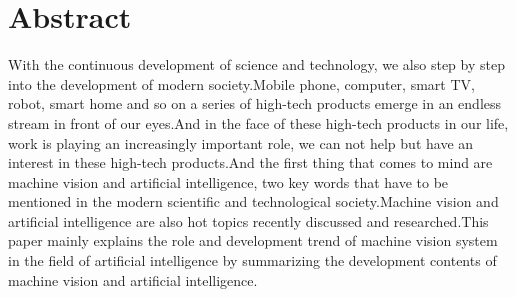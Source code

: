 \chapter*{Abstract}%

With the continuous development of science and technology, we also step by step into the development of modern society.Mobile phone, computer, smart TV, robot, smart home and so on a series of high-tech products emerge in an endless stream in front of our eyes.And in the face of these high-tech products in our life, work is playing an increasingly important role, we can not help but have an interest in these high-tech products.And the first thing that comes to mind are machine vision and artificial intelligence, two key words that have to be mentioned in the modern scientific and technological society.Machine vision and artificial intelligence are also hot topics recently discussed and researched.This paper mainly explains the role and development trend of machine vision system in the field of artificial intelligence by summarizing the development contents of machine vision and artificial intelligence.



